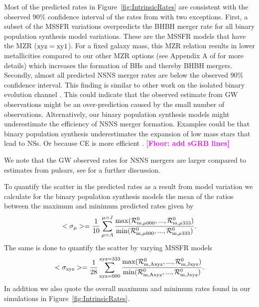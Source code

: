 \documentclass[twocolumn]{aastex63}
\newcommand{\floor}[1]{\textbf{\textcolor{magenta}{[Floor: #1]}}}
\newcommand\rate{\mathcal{R}}
\begin{document}
Most of the predicted rates in Figure~\ref{fig:IntrinsicRates} are consistent with the observed $90\%$ confidence interval of the rates from \citep{2019PhRvX...9c1040A,2020arXiv200101761T} with two exceptions.
First, a subset of the \ac{MSSFR} variations overpredicts the  BHBH merger rate for all binary population synthesis model variations. These are the \ac{MSSFR} models that have the  \citet{2006ApJ...638L..63L}   MZR ($\rm{xyz}=\rm{xy}1$). For a fixed galaxy mass, this   MZR relation results in lower metallicities compared to our other MZR options (see Appendix A of  \citealt{2019MNRAS.490.3740N} for more details) which increases the formation of \acp{BH} and thereby  BHBH mergers. 
Secondly,   almost all  predicted NSNS merger rates  are below the observed 90$\%$ confidence interval.  
 This finding is similar to other work on the isolated binary evolution channel  \citep[e.g.][]{2018MNRAS.474.2937C}. This could indicate  that the observed estimate from \ac{GW} observations might be an over-prediction caused by the small number of observations. Alternatively,   our binary population synthesis models might underestimate the efficiency of NSNS merger formation. Examples could be that  binary population synthesis underestimates the expansion of low mass stars that lead to NSs. Or because CE is more efficient .  \floor{add sGRB lines}

We note that the \ac{GW} observed rates for  NSNS mergers are larger compared to estimates from pulsars, see \citep{2018MNRAS.474.2937C} for a further discussion. 
 


To quantify the scatter in the predicted rates as a result from model variation we calculate for  the binary population synthesis models the mean of the ratios between the maximum and minimum predicted rates given by
%
\begin{equation}
<\sigma_{\rm{\mu}}> = \frac{1}{10} \sum_{\mu=A}^{\mu=J}
 \frac{\rm{max}(\rate_{\rm{m, \mu000}}^0,... ,\rate_{\rm{m, \mu333}}^0 )}{\rm{min}(\rate_{\rm{m, \mu000}}^0,... ,\rate_{\rm{m, \mu333}}^0 ) }.
\end{equation} 
%
The same is done to quantify the scatter by varying \ac{MSSFR} models
%
\begin{equation}
<\sigma_{\rm{xyz}}> = \frac{1}{28} \sum_{\rm{xyz}=000}^{\rm{xyz}=333}
 \frac{\rm{max}(\rate_{\rm{m, Axyz}}^0,... ,\rate_{\rm{m, Jxyz}}^0 )}{\rm{min}(\rate_{\rm{m, Axyz}}^0,... ,\rate_{\rm{m, Jxyz}}^0)}.
\end{equation} 
%
In addition we also quote the overall maximum and minimum rates found in our simulations in Figure~\ref{fig:IntrinsicRates}. 
\end{document}
